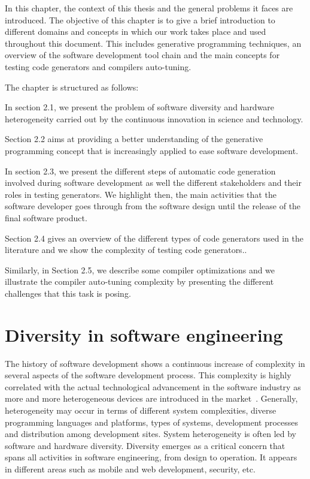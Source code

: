  
In this chapter, the context of this thesis and the general problems it faces are introduced. The objective of this chapter is to give a brief introduction to  different domains and concepts in which our work takes place and used throughout this document.
This includes generative programming techniques, an overview of the software development tool chain and the main concepts for testing code generators and compilers auto-tuning.


The chapter is structured as follows: 

In section 2.1, we present the problem of software diversity and hardware heterogeneity carried out by the continuous innovation in science and technology.

Section 2.2 aims at providing a better understanding of the generative programming concept that is increasingly applied to ease software development. 

In section 2.3, we present the different steps of automatic code generation involved during software development as well the different stakeholders and their roles in testing generators. We highlight then, the main activities that the software developer goes through from the software design until the release of the final software product.

Section 2.4 gives an overview of the different types of code generators used in the literature and we show the complexity of testing code generators.. 

Similarly, in Section 2.5, we describe some compiler optimizations and we illustrate the compiler auto-tuning complexity by presenting the different challenges that this task is posing.


\section{Diversity in software engineering}
The history of software development shows a continuous increase of complexity in several aspects of the software development process. This complexity is highly correlated with the actual technological advancement in the software industry as more and more heterogeneous devices are introduced in the market~\cite{betz2011improving}. 
Generally, heterogeneity may occur in terms of different system complexities, diverse programming languages and platforms, types of systems, development processes and distribution among development sites\cite{ghazi2015heterogeneous}.
System heterogeneity is often led by software and hardware diversity.
Diversity emerges as a critical concern that spans all activities in software engineering, from design to operation\cite{acher2014software}. It appears in different areas such as mobile and web development\cite{doukas2013compose}, security\cite{allier2015multitier}, etc.

